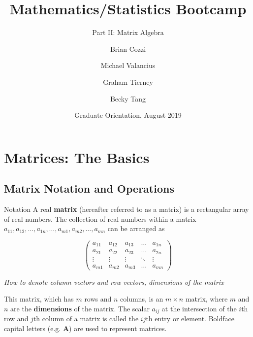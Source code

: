 \documentclass{beamer}
\title[Matrices]{Mathematics/Statistics Bootcamp} %
\subtitle{Part II: Matrix Algebra}
\author{Brian Cozzi\inst{1} \and Michael Valancius\inst{1} \and Graham Tierney\inst{1} \and Becky Tang\inst{1}}
\institute[Duke University] %
{
  \inst{1}%
  Department of Statistical Science\\
  Duke University
  }
\date{Graduate Orientation, August 2019}
\begin{document}
\begin{frame}
  \titlepage
\end{frame}

\section{Matrices: The Basics}

\subsection{Matrix Notation and Operations}
\begin{frame}{Notation}
A real \textbf{matrix} (hereafter referred to as a matrix) is a rectangular array of real numbers.  The collection of real numbers within a matrix $a_{11}, a_{12}, \hdots, a_{1n}, \hdots, a_{m1}, a_{m2}, \hdots, a_{mn}$ can be arranged as

\[
\begin{pmatrix}
    a_{11} & a_{12} & a_{13} & \dots  & a_{1n} \\
    a_{21} & a_{22} & a_{23} & \dots  & a_{2n} \\
    \vdots & \vdots & \vdots & \ddots & \vdots \\
    a_{m1} & a_{m2} & a_{m3} & \dots  & a_{mn}
\end{pmatrix}
\]

\textit{How to denote column vectors and row vectors, dimensions of the matrix}

This matrix, which has $m$ rows and $n$ columns, is an $m \times n$ matrix, where $m$ and $n$ are the \textbf{dimensions} of the matrix.  The scalar $a_{ij}$ at the intersection of the $i$th row and $j$th column of a matrix is called the $ij$th entry or element.  Boldface capital letters (e.g. $\mathbf{A}$) are used to represent matrices. \\
\end{frame}
\end{document}
